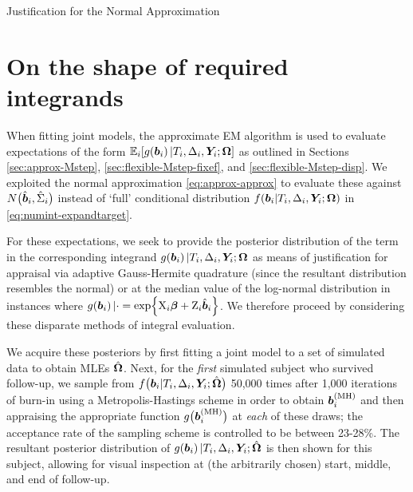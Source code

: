 \begin{chapter}{\label{cha:justification}Justification for the Normal Approximation}
  \section{On the shape of required integrands}\label{sec:justification-integrands}
  When fitting joint models, the approximate EM algorithm is used to evaluate expectations of the form $\mathbb{E}_i\!\left[ g\!\left(\bm{b}_i\right)|T_i,\Delta_i,\bm{Y}_i;\bm{\mathrm{\Omega}}\right]$ as outlined in Sections \ref{sec:approx-Mstep}, \ref{sec:flexible-Mstep-fixef}, and \ref{sec:flexible-Mstep-disp}. We exploited the normal approximation \eqref{eq:approx-approx} to evaluate these against $N\big(\hat{\bm{b}}_i,\hat{\Sigma}_i\big)$ instead of `full' conditional distribution $f\!\left(\bm{b}_i|T_i, \Delta_i, \bm{Y}_i; \bm{\mathrm{\Omega}}\right)$ in \eqref{eq:numint-expandtarget}.

  For these expectations, we seek to provide the posterior distribution of the term in the corresponding integrand \ie $g\!\left(\bm{b}_i\right)|T_i,\Delta_i,\bm{Y}_i;\bm{\mathrm{\Omega}}$ as means of justification for appraisal via adaptive Gauss-Hermite quadrature (since the resultant distribution resembles the normal) or at the median value of the log-normal distribution in instances where $g\!\left(\bm{b}_i\right)|\cdot=\exp\!\left\{\mathrm{X}_i\bm{\beta}+\mathrm{Z}_i\hat{\bm{b}}_i\right\}$. We therefore proceed by considering these disparate methods of integral evaluation.

  We acquire these posteriors by first fitting a joint model to a set of simulated data to obtain MLEs $\hat{\bm{\Omega}}$. Next, for the \textit{first} simulated subject who survived follow-up, we sample from $f\big(\bm{b}_i|T_i,\Delta_i,\bm{Y}_i;\hat{\bm{\Omega}}\big)$ 50,000 times after 1,000 iterations of burn-in using a Metropolis-Hastings scheme in order to obtain $\bm{b}_i^{(\mathrm{MH})}$ and then appraising the appropriate function $g\big(\bm{b}_i^{(\mathrm{MH})}\big)$ at \textit{each} of these draws; the acceptance rate of the sampling scheme is controlled to be between 23-28\%. The resultant posterior distribution of $g\!\left(\bm{b}_i\right)|T_i,\Delta_i,\bm{Y}_i;\hat{\bm{\Omega}}$ is then shown for this subject, allowing for visual inspection at (the arbitrarily chosen) start, middle, and end of follow-up.


\end{chapter}
